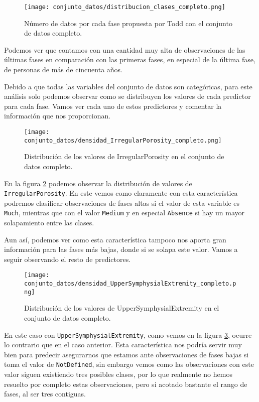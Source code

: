 \begin{figure}[H]
	\centering
	\texttt{[image: conjunto\_datos/distribucion\_clases\_completo.png]}
	\caption{Número de datos por cada fase propuesta por Todd con el conjunto de datos completo.}
	\label{fig:conteo_c}
\end{figure}


Podemos ver que contamos con una cantidad muy alta de observaciones de las últimas fases en comparación con las primeras fases, en especial de la última fase, de personas de más de cincuenta años.

Debido a que todas las variables del conjunto de datos son categóricas, para este análisis solo podemos observar como se distribuyen los valores de cada predictor para cada fase. Vamos ver cada uno de estos predictores y comentar la información que nos proporcionan.


\begin{figure}[H]
	\centering
	\texttt{[image: conjunto\_datos/densidad\_IrregularPorosity\_completo.png]}
	\caption{Distribución de los valores de IrregularPorosity en el conjunto de datos completo.}
	\label{fig:densidad_IrregularPorosity_completo}
\end{figure}

En la figura \ref{fig:densidad_IrregularPorosity_completo} podemos observar la distribución de valores de \texttt{IrregularPorosity}. En este vemos como claramente con esta característica podremos clasificar observaciones de fases altas si el valor de esta variable es \texttt{Much}, mientras que con el valor \texttt{Medium} y en especial \texttt{Absence} si hay un mayor solapamiento entre las clases.

Aun así, podemos ver como esta característica tampoco nos aporta gran información para las fases más bajas, donde si se solapa este valor. Vamos a seguir observando el resto de predictores.




\begin{figure}[H]
	\centering
	\texttt{[image: conjunto\_datos/densidad\_UpperSymphysialExtremity\_completo.png]}
	\caption{Distribución de los valores de UpperSymphysialExtremity en el conjunto de datos completo.}
	\label{fig:densidad_UpperSymphysialExtremity_completo}
\end{figure}

En este caso con \texttt{UpperSymphysialExtremity}, como vemos en la figura \ref{fig:densidad_UpperSymphysialExtremity_completo}, ocurre lo contrario que en el caso anterior. Esta característica nos podría servir muy bien para predecir asegurarnos que estamos ante observaciones de fases bajas si toma el valor de \texttt{NotDefined}, sin embargo vemos como las observaciones con este valor siguen existiendo tres posibles clases, por lo que realmente no hemos resuelto por completo estas observaciones, pero si acotado bastante el rango de fases, al ser tres contiguas.


